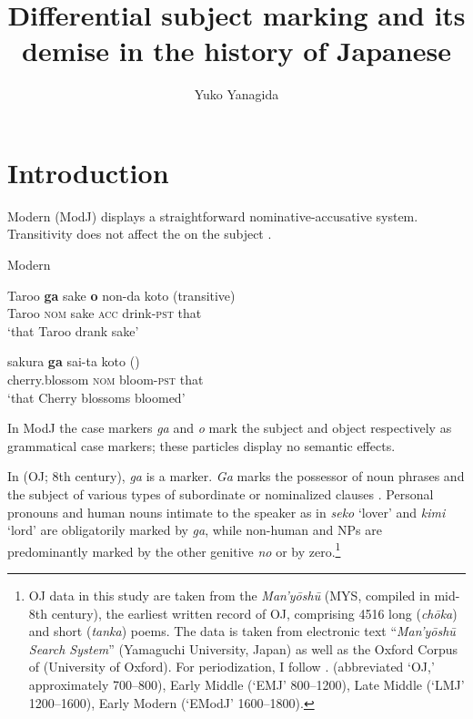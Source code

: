 \documentclass[output=paper]{LSP/langsci}
\author{Yuko Yanagida\affiliation{University of Tsukuba}}
\title{Differential subject marking and its demise in the history of Japanese}
\begin{document}
\section{Introduction}
\label{14-ya-sec:1}

Modern  (ModJ) displays a straightforward nominative-accusative system. Transitivity does not affect the  on the subject .

\begin{exe}
\ex Modern %
\label{14-ya-ex:1}
\begin{xlist}
\ex
\label{14-ya-ex:1a}
\gll Taroo \textbf{ga} sake \textbf{o} non-da koto \upshape(transitive)\\
Taroo \textsc{nom} sake \textsc{acc} drink-\textsc{pst} that\\
\glt ‘that Taroo drank sake’

\ex
\label{14-ya-ex:1b}
\gll sakura \textbf{ga} sai-ta koto \upshape()\\
cherry.blossom \textsc{nom} bloom-\textsc{pst} that\\
\glt ‘that Cherry blossoms bloomed’
\end{xlist}
\end{exe}


In ModJ the case markers \textit{ga} and \textit{o} mark the subject and object respectively as grammatical case markers; these particles display no semantic effects. 

In  (OJ; 8th century), \textit{ga} is a  marker. \textit{Ga} marks the possessor of noun phrases  and the subject of various types of subordinate or nominalized clauses . Personal pronouns and human nouns intimate to the speaker as in \textit{seko} ‘lover’ and \textit{kimi} ‘lord’ are obligatorily marked by \textit{ga}, while non-human  and  NPs are predominantly marked by the other genitive \textit{no} or by zero.\footnote{OJ data in this study are taken from the \textit{Man’y\=osh\=u} (MYS, compiled in mid-8th century), the earliest written record of OJ, comprising 4516 long (\textit{ch\=oka}) and short (\textit{tanka}) poems. The data is taken from electronic text “\textit{Man’y\=osh\=u Search System}” (Yamaguchi University, Japan) as well as the Oxford Corpus of  (University of Oxford). For periodization, I follow \citet{Frellesvig2010Japanese}.  (abbreviated ‘OJ,’ approximately 700–800), Early Middle  (‘EMJ’ 800–1200), Late Middle  (‘LMJ’ 1200–1600), Early Modern  (‘EModJ’ 1600–1800).}
\end{document}

